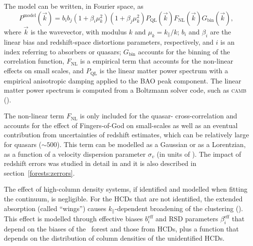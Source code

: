 The model can be written, in Fourier space, as 
\begin{equation}
    P^\mathrm{model}(\vec{k}) = b_i b_j 
        \left(1+\beta_i \mu^2_k\right) \left(1+\beta_j \mu^2_k\right) 
        P_\mathrm{ QL}(\vec{k}) F_\mathrm{NL}(\vec{k})G_\mathrm{ bin}(\vec{k}), 
    \label{eq:power_spectrum}
\end{equation}
where $\vec{k}$ is the wavevector, with modulus $k$ and $\mu_k = k_\parallel/k$;
$b_i$ and $\beta_i$ are the linear bias and redshift-space distortions parameters, respectively,
and $i$ is an index referring to absorbers or quasars; 
$G_\mathrm{ bin}$ accounts for the binning of the correlation function, 
$F_\mathrm{NL}$ is a empirical term that accounts for the non-linear effects on small scales, 
and $ P_\mathrm{ QL}$ is the linear matter power spectrum with a empirical anisotropic 
damping applied to the BAO peak component. 
The linear matter power spectrum is computed from a Boltzmann solver code, 
such as \textsc{camb} (\cite{lewisEfficientComputationCosmic2000}). 

The non-linear term $F_\mathrm{NL}$ is only included for the quasar-\lya 
cross-correlation and accounts for the effect of Fingers-of-God on small-scales as well as 
an eventual contribution from uncertainties of redshift estimates,
which can be relatively large for quasars ($\sim 500$\kms). 
This term can be modelled as a Gaussian or as a Lorentzian, as a function of a 
velocity dispersion parameter $\sigma_v$ (in units of \kms).
The impact of redshift errors was studied in detail in 
\cite{youlesEffectQuasarRedshift2022} and it is also described in 
section~\ref{forests:zerrors}.

The effect of high-column density systems, if identified and modelled 
when fitting the continuum, is negligible. For the HCDs that are 
not identified, the extended absorption (called ``wings'') causes 
$k_\parallel$-dependent broadening of the clustering 
(\cite{font-riberaEffectHighColumn2012,
rogersCorrelationsThreedimensionalLymanalpha2018}). 
This effect is modelled through effective biases $b_i^\mathrm{eff}$ 
and RSD parameters $\beta_i^\mathrm{eff}$ that depend on the 
biases of the \lya\ forest and those from HCDs, plus a function 
that depends on the distribution of column densities of the unidentified 
HCDs. 

